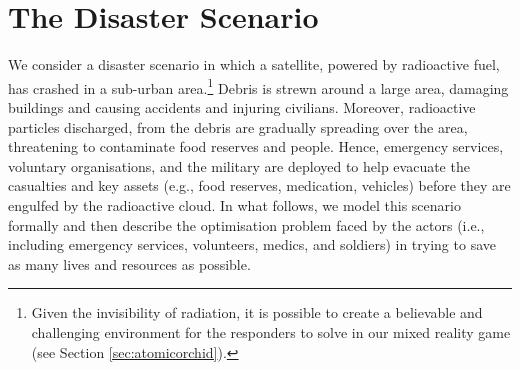\section{The Disaster Scenario}\label{sec:scenario}
\noindent We consider a disaster scenario in which a satellite, powered by radioactive fuel,  has crashed in a sub-urban area.\footnote{Given the invisibility of radiation, it is possible to create a believable and challenging environment for the responders to solve in our mixed reality game (see Section \ref{sec:atomicorchid}).} Debris is strewn around a large area, damaging buildings and causing accidents and injuring civilians. Moreover, radioactive particles discharged, from the debris are gradually spreading over the area, threatening to contaminate food reserves and people. Hence, emergency services, voluntary organisations, and the military are deployed to help evacuate the casualties and key assets (e.g., food reserves, medication, vehicles) before they are engulfed by the radioactive cloud.  In what follows, we model this scenario formally and then describe the optimisation problem faced by the actors  (i.e., including emergency services, volunteers, medics, and soldiers) in trying to save as many lives and resources as possible.  


